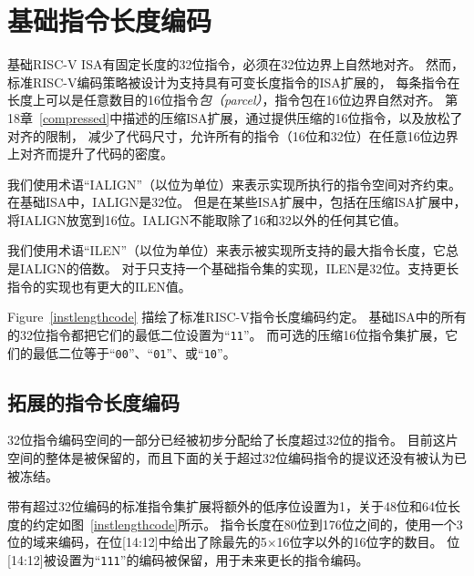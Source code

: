 \section{基础指令长度编码}

基础RISC-V ISA有固定长度的32位指令，必须在32位边界上自然地对齐。
然而，标准RISC-V编码策略被设计为支持具有可变长度指令的ISA扩展的，
每条指令在长度上可以是任意数目的16位指令{\em 包（parcel）}，指令包在16位边界自然对齐。
第18章~\ref{compressed}中描述的压缩ISA扩展，通过提供压缩的16位指令，以及放松了对齐的限制，
减少了代码尺寸，允许所有的指令（16位和32位）在任意16位边界上对齐而提升了代码的密度。

我们使用术语“IALIGN”（以位为单位）来表示实现所执行的指令空间对齐约束。在基础ISA中，IALIGN是32位。
但是在某些ISA扩展中，包括在压缩ISA扩展中，将IALIGN放宽到16位。IALIGN不能取除了16和32以外的任何其它值。

我们使用术语“ILEN”（以位为单位）来表示被实现所支持的最大指令长度，它总是IALIGN的倍数。
对于只支持一个基础指令集的实现，ILEN是32位。支持更长指令的实现也有更大的ILEN值。

Figure~\ref{instlengthcode} 描绘了标准RISC-V指令长度编码约定。
基础ISA中的所有的32位指令都把它们的最低二位设置为“{\tt 11}”。
而可选的压缩16位指令集扩展，它们的最低二位等于“{\tt 00}”、“{\tt 01}”、或“{\tt 10}”。

\subsection*{拓展的指令长度编码}

32位指令编码空间的一部分已经被初步分配给了长度超过32位的指令。
目前这片空间的整体是被保留的，而且下面的关于超过32位编码指令的提议还没有被认为已被冻结。

带有超过32位编码的标准指令集扩展将额外的低序位设置为1，关于48位和64位长度的约定如图~\ref{instlengthcode}所示。
指令长度在80位到176位之间的，使用一个3位的域来编码，在位[14:12]中给出了除最先的5$\times$16位字以外的16位字的数目。
位[14:12]被设置为“{\tt 111}”的编码被保留，用于未来更长的指令编码。


